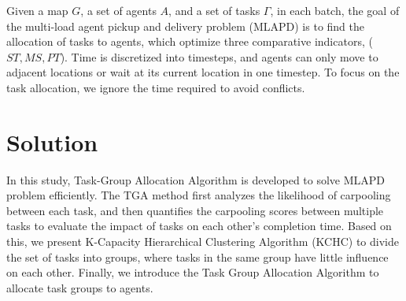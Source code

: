\documentclass[sigconf,anonymous]{aamas}
\begin{document}
\begin{definition}[MLAPD]
\label{ProDfn}
    Given a map $G$, a set of agents $A$, and a set of tasks $\Gamma$,
    in each batch, the goal of
    the multi-load agent pickup and delivery problem (MLAPD) is to find the allocation of tasks to agents,
    which optimize three comparative indicators, ($ST, MS, PT$).
    Time is discretized into timesteps, and agents can only move to adjacent locations
    or wait at its current location in one timestep.
    To focus on the task allocation, we ignore the time required to avoid conflicts.
\end{definition}
 
\section{Solution}
\label{sec:solution}
In this study, Task-Group Allocation Algorithm is developed to solve MLAPD problem efficiently. 
The TGA method first analyzes the likelihood of carpooling between each task, 
and then quantifies the carpooling scores between multiple tasks to evaluate the impact of tasks on each other's completion time.
Based on this, we present K-Capacity Hierarchical Clustering Algorithm (KCHC) to divide the set of tasks into groups,
where tasks in the same group have little influence on each other.
Finally, we introduce the Task Group Allocation Algorithm to allocate task groups to agents.
\end{document}
